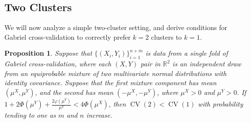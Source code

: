 \documentclass[12pt]{article}
\newtheorem{proposition}{Proposition}
\newcommand{\CV}{\operatorname{CV}}
\newcommand{\R}{\mathbb{R}}
\newcommand{\muX}{\mu^{X}}
\newcommand{\muY}{\mu^{Y}}
\begin{document}
\subsection{Two Clusters}

We will now analyze a simple two-cluster setting, and derive conditions for
Gabriel cross-validation to correctly prefer $k=2$ clusters to $k=1$.

\begin{proposition}
Suppose that $\{(X_i,Y_i)\}_{i=1}^{n+m}$ is data from a single fold of Gabriel
cross-validation, where each $(X,Y)$ pair in $\R^2$ is an independent draw
from an equiprobable mixture of two multivariate normal distributions with
identity covariance. Suppose that the first mixture component has mean $(\muX,
\muY)$, and the second has mean $(-\muX, -\muY)$, where $\muX > 0$ and
$\muY > 0$.  If $1 + 2\Phi(\mu^Y)+ \frac{2\varphi(\mu^Y)}{\mu^Y} < 4\Phi(\mu^X)$, then $\CV(2) < \CV(1)$ with
probability tending to one as $m$ and $n$ increase.
\end{proposition}
\end{document}
